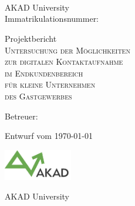 

\begin{titlepage}


\vspace{5cm}

\Name \\ 
\Strasse \\ 
\PlzOrt\\ 
\href{mailto:\Email}{\Email}

AKAD University\\
Immatrikulationsnummer: \Immatrikulationsnummer

\vfill

Projektbericht\\
\LARGE
\textsc{Untersuchung der Möglichkeiten\\
zur digitalen Kontaktaufnahme\\
im Endkundenbereich\\
für kleine Unternehmen\\
des Gastgewerbes}

\vfill

\normalsize

Betreuer: \Betreuer

Entwurf vom \today %

\vfill

\includegraphics[width=3cm]{akad_logo.png}

AKAD University

\end{titlepage}



\normalsize
